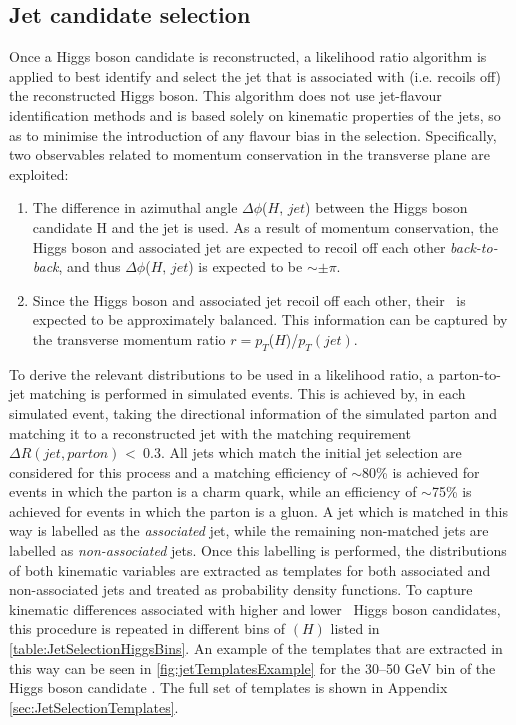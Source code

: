 \subsection{Jet candidate selection}
\label{sec:JetCandidateSelection}
Once a Higgs boson candidate is reconstructed, a likelihood ratio algorithm is applied to best identify and select the jet that is associated with (i.e. recoils off) the reconstructed Higgs boson. This algorithm does not use jet-flavour identification methods and is based solely on kinematic properties of the jets, so as to minimise the introduction of any flavour bias in the selection. Specifically, two observables related to momentum conservation in the transverse plane are exploited: 
\begin{enumerate}
    \item The difference in azimuthal angle  $\Delta\phi$($H,\,jet$) between the Higgs boson candidate H and the jet is used. As a result of momentum conservation, the Higgs boson and associated jet are expected to recoil off each other \textit{back-to-back}, and thus $\Delta\phi$($H,\,jet$) is expected to be $\sim \pm \pi$.
    \item Since the Higgs boson and associated jet recoil off each other, their \pt \, is expected to be approximately balanced. This information can be captured by the transverse momentum ratio $r = p_{T}$($H$)/$p_{T}(jet)$. 
\end{enumerate}
To derive the relevant distributions to be used in a likelihood ratio, a parton-to-jet matching is performed in simulated \cHZZsen events. This is achieved by, in each simulated event, taking the directional information of the simulated parton and matching it to a reconstructed jet with the matching requirement $\Delta R(jet, parton)$ \textless\, 0.3. All jets which match the initial jet selection are considered for this process and a matching efficiency of $\sim$80\% is achieved for events in which the parton is a charm quark, while an efficiency of $\sim$75\% is achieved for events in which the parton is a gluon. A jet which is matched in this way is labelled as the \textit{associated} jet, while the remaining non-matched jets are labelled as \textit{non-associated} jets. Once this labelling is performed, the distributions of both kinematic variables are extracted as templates for both associated and non-associated jets and treated as probability density functions. To capture kinematic differences associated with higher and lower \pt \, Higgs boson candidates, this procedure is repeated in different bins of \pt$(H)$ listed in \autoref{table:JetSelectionHiggsBins}. An example of the templates that are extracted in this way can be seen in \autoref{fig:jetTemplatesExample} for the 30--50 GeV bin of the Higgs boson candidate \pt. The full set of templates is shown in Appendix \autoref{sec:JetSelectionTemplates}. \\
